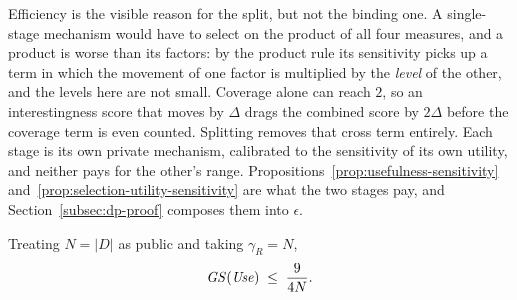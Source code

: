 Efficiency is the visible reason for the split, but not the binding one.
A single-stage mechanism would have to select on the product of all four measures, and a product is worse than its factors: by the product rule its sensitivity picks up a term in which the movement of one factor is multiplied by the \emph{level} of the other, and the levels here are not small.
Coverage alone can reach $2$, so an interestingness score that moves by $\Delta$ drags the combined score by $2\Delta$ before the coverage term is even counted.
Splitting removes that cross term entirely.
Each stage is its own private mechanism, calibrated to the sensitivity of its own utility, and neither pays for the other's range.
Propositions~\ref{prop:usefulness-sensitivity} and~\ref{prop:selection-utility-sensitivity} are what the two stages pay, and Section~\ref{subsec:dp-proof} composes them into $\epsilon$.

\begin{proposition}
\label{prop:usefulness-sensitivity}
Treating $N=|D|$ as public and taking $\gamma_R=N$,
\[
\mathit{GS}(\mathit{Use})\;\le\;\frac{9}{4N}.
\]
\end{proposition}

